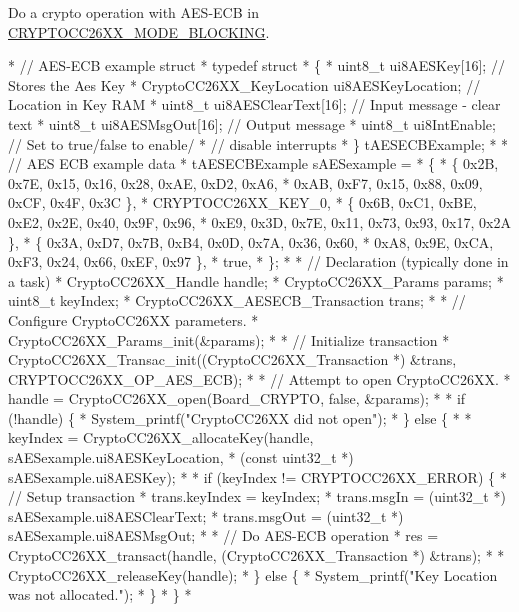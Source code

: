 Do a crypto operation with A\-E\-S-\/\-E\-C\-B in \hyperlink{_crypto_c_c26_x_x_8h_abf86c8ac428559f00fed3299d439e2cdaf0a9faf35a12d014c5f3a475906a3373}{C\-R\-Y\-P\-T\-O\-C\-C26\-X\-X\-\_\-\-M\-O\-D\-E\-\_\-\-B\-L\-O\-C\-K\-I\-N\-G}. 
\begin{DoxyCode}
*  \textcolor{comment}{// AES-ECB example struct}
*  \textcolor{keyword}{typedef} \textcolor{keyword}{struct}
*  \{
*      uint8\_t ui8AESKey[16];                      \textcolor{comment}{// Stores the Aes Key}
*      CryptoCC26XX_KeyLocation ui8AESKeyLocation; \textcolor{comment}{// Location in Key RAM}
*      uint8\_t ui8AESClearText[16];                \textcolor{comment}{// Input message - clear text}
*      uint8\_t ui8AESMsgOut[16];                   \textcolor{comment}{// Output message}
*      uint8\_t ui8IntEnable;                       \textcolor{comment}{// Set to true/false to enable/}
*                                                  \textcolor{comment}{// disable interrupts}
*  \} tAESECBExample;
*
*  \textcolor{comment}{// AES ECB example data}
*  tAESECBExample sAESexample =
*  \{
*      \{ 0x2B, 0x7E, 0x15, 0x16, 0x28, 0xAE, 0xD2, 0xA6,
*      0xAB, 0xF7, 0x15, 0x88, 0x09, 0xCF, 0x4F, 0x3C \},
*      CRYPTOCC26XX_KEY_0,
*      \{ 0x6B, 0xC1, 0xBE, 0xE2, 0x2E, 0x40, 0x9F, 0x96,
*      0xE9, 0x3D, 0x7E, 0x11, 0x73, 0x93, 0x17, 0x2A \},
*      \{ 0x3A, 0xD7, 0x7B, 0xB4, 0x0D, 0x7A, 0x36, 0x60,
*      0xA8, 0x9E, 0xCA, 0xF3, 0x24, 0x66, 0xEF, 0x97 \},
*      \textcolor{keyword}{true},
*  \};
*
*  \textcolor{comment}{// Declaration (typically done in a task)}
*  CryptoCC26XX_Handle             handle;
*  CryptoCC26XX_Params             params;
*  uint8\_t                         keyIndex;
*  CryptoCC26XX_AESECB_Transaction trans;
*
*  \textcolor{comment}{// Configure CryptoCC26XX parameters.}
*  CryptoCC26XX_Params_init(&params);
*
*  \textcolor{comment}{// Initialize transaction}
*  CryptoCC26XX_Transac_init((CryptoCC26XX_Transaction *) &trans, 
      CRYPTOCC26XX_OP_AES_ECB);
*
*  \textcolor{comment}{// Attempt to open CryptoCC26XX.}
*  handle = CryptoCC26XX_open(Board\_CRYPTO, \textcolor{keyword}{false}, &params);
*
*  \textcolor{keywordflow}{if} (!handle) \{
*      System\_printf(\textcolor{stringliteral}{"CryptoCC26XX did not open"});
*  \} \textcolor{keywordflow}{else} \{
*
*      keyIndex = CryptoCC26XX_allocateKey(handle, sAESexample.ui8AESKeyLocation,
*                                           (\textcolor{keyword}{const} uint32\_t *) sAESexample.ui8AESKey);
*
*      \textcolor{keywordflow}{if} (keyIndex != CRYPTOCC26XX_ERROR) \{
*          \textcolor{comment}{// Setup transaction}
*          trans.keyIndex         = keyIndex;
*          trans.msgIn            = (uint32\_t *) sAESexample.ui8AESClearText;
*          trans.msgOut           = (uint32\_t *) sAESexample.ui8AESMsgOut;
*
*          \textcolor{comment}{// Do AES-ECB operation}
*          res = CryptoCC26XX_transact(handle, (CryptoCC26XX_Transaction *) &trans);
*
*          CryptoCC26XX_releaseKey(handle);
*      \} \textcolor{keywordflow}{else} \{
*          System\_printf(\textcolor{stringliteral}{"Key Location was not allocated."});
*      \}
*  \}
*  
\end{DoxyCode}


